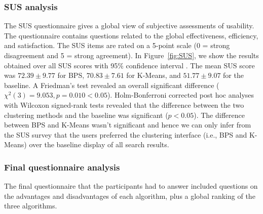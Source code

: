 \subsubsection{SUS analysis}
The SUS questionnaire gives a global view of subjective assessments of usability. The questionnaire contains questions related to the global effectiveness, efficiency, and satisfaction. The SUS items are rated on a 5-point scale (0 = strong disagreement and 5 = strong agreement). In Figure~\ref{fig:SUS}, we show the results obtained over all SUS scores  with 95\% confidence interval . The mean SUS score was $72.39\pm 9.77$ for BPS, $70.83\pm 7.61$ for K-Means, and $51.77\pm 9.07$ for the baseline. A Friedman's test revealed an overall significant difference ($\chi^2(3)= 9.053, p=0.010 < 0.05$).
Holm-Bonferroni corrected post hoc analyses with Wilcoxon signed-rank tests 
revealed that the difference between the two clustering methods and the baseline  was significant ($p < 0.05$). The difference between BPS and K-Means wasn't significant and hence we can only infer from the SUS survey that the users preferred the clustering interface (i.e., BPS and K-Means) over the baseline display of all search results.


\subsubsection{Final questionnaire analysis}
The final questionnaire that the participants had to answer included questions on the advantages and disadvantages of each algorithm, plus a global ranking of the three algorithms. %











